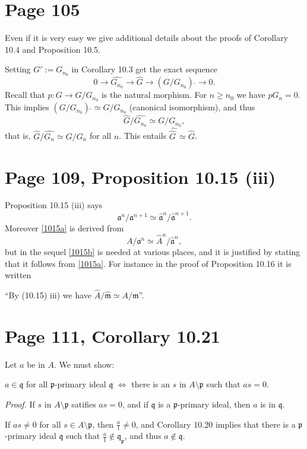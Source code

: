 \documentclass[12pt]{article}
\newcommand{\mf}{\mathfrak}
\begin{document}
\section{Page 105}%

Even if it is very easy we give additional details about the proofs of Corollary 10.4 and Proposition 10.5. 

Setting $G':=G_{n_0}$ in Corollary 10.3 get the exact sequence
$$
0\to\widehat{G_{n_0}}\to\widehat G\to(G/G_{n_0})\ \widehat{}\to0.
$$ 
Recall that $p:G\to G/G_{n_0}$ is the natural morphism. For $n\ge n_0$ we have $pG_n=0$. This implies $(G/G_{n_0})\ \widehat{}\simeq G/G_{n_0}$ (canonical isomorphism), and thus 
$$
\widehat G/\widehat{G_{n_0}}\simeq G/G_{n_0},
$$ 
that is, $\widehat G/\widehat{G_n}\simeq G/G_n$ for all $n$. This entails $\widehat{\widehat G\,}\simeq\widehat G$.

\section{Page 109, Proposition 10.15 (iii)}%

Proposition 10.15 (iii) says 
\begin{equation}\label{1015a}
\mf a^n/\mf a^{n+1}\simeq\hat{\mf a}^n/\hat{\mf a}^{n+1}.
\end{equation}
Moreover \eqref{1015a} is derived from 
\begin{equation}\label{1015b}
A/\mf a^n\simeq\hat A^n/\hat{\mf a}^n,
\end{equation} 
but in the sequel \eqref{1015b} is needed at various places, and it is justified by stating that it follows from \eqref{1015a}. For instance in the proof of Proposition 10.16 it is written

``By (10.15) iii) we have $\hat A/\hat{\mf m}\simeq A/\mf m$''.

\section{Page 111, Corollary 10.21}%

Let $a$ be in $A$. We must show: 

$a\in\mf q$ for all $\mf p$-primary ideal $\mf q$ $\iff$ there is an $s$ in $A\setminus\mf p$ such that $as=0$. 

\emph{Proof.} If $s$ in $A\setminus\mf p$ satifies $as=0$, and if $\mf q$ is a $\mf p$-primary ideal, then $a$ is in $\mf q$.

If $as\neq0$ for all $s\in A\setminus\mf p$, then $\frac a1\neq0$, and Corollary 10.20 implies that there is a $\mf p$-primary ideal $\mf q$ such that $\frac a1\notin\mf q_{\mf p}$, and thus $a\notin\mf q$.
\end{document}
